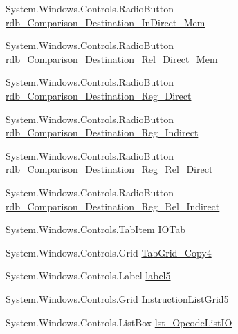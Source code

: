 \begin{DoxyCompactItemize}
\item 
System.\+Windows.\+Controls.\+Radio\+Button \hyperlink{class_c_p_u___o_s___simulator_1_1_instructions_window_afbf88d254cc285a8412281f2f58561df}{rdb\+\_\+\+Comparison\+\_\+\+Destination\+\_\+\+In\+Direct\+\_\+\+Mem}
\item 
System.\+Windows.\+Controls.\+Radio\+Button \hyperlink{class_c_p_u___o_s___simulator_1_1_instructions_window_a2839938b38b1adc8d6274ccd688bce81}{rdb\+\_\+\+Comparison\+\_\+\+Destination\+\_\+\+Rel\+\_\+\+Direct\+\_\+\+Mem}
\item 
System.\+Windows.\+Controls.\+Radio\+Button \hyperlink{class_c_p_u___o_s___simulator_1_1_instructions_window_ad0171922de56e654ef3f2a32522c696f}{rdb\+\_\+\+Comparison\+\_\+\+Destination\+\_\+\+Reg\+\_\+\+Direct}
\item 
System.\+Windows.\+Controls.\+Radio\+Button \hyperlink{class_c_p_u___o_s___simulator_1_1_instructions_window_a7082d6a482df06092eb9fba0db2c6c7e}{rdb\+\_\+\+Comparison\+\_\+\+Destination\+\_\+\+Reg\+\_\+\+Indirect}
\item 
System.\+Windows.\+Controls.\+Radio\+Button \hyperlink{class_c_p_u___o_s___simulator_1_1_instructions_window_a2b612e12101797715ea8bdf811957ee7}{rdb\+\_\+\+Comparison\+\_\+\+Destination\+\_\+\+Reg\+\_\+\+Rel\+\_\+\+Direct}
\item 
System.\+Windows.\+Controls.\+Radio\+Button \hyperlink{class_c_p_u___o_s___simulator_1_1_instructions_window_aa4e8437abdc13829f81759f6a796b6de}{rdb\+\_\+\+Comparison\+\_\+\+Destination\+\_\+\+Reg\+\_\+\+Rel\+\_\+\+Indirect}
\item 
System.\+Windows.\+Controls.\+Tab\+Item \hyperlink{class_c_p_u___o_s___simulator_1_1_instructions_window_aaf736178464d8313c866ab6efeae19c5}{I\+O\+Tab}
\item 
System.\+Windows.\+Controls.\+Grid \hyperlink{class_c_p_u___o_s___simulator_1_1_instructions_window_a33c64471b02aed8597462149051c2b51}{Tab\+Grid\+\_\+\+Copy4}
\item 
System.\+Windows.\+Controls.\+Label \hyperlink{class_c_p_u___o_s___simulator_1_1_instructions_window_acfbda3e1b251a166abc72a07d4cb5025}{label5}
\item 
System.\+Windows.\+Controls.\+Grid \hyperlink{class_c_p_u___o_s___simulator_1_1_instructions_window_a335e8ec02a78ffc483900745de96b602}{Instruction\+List\+Grid5}
\item 
System.\+Windows.\+Controls.\+List\+Box \hyperlink{class_c_p_u___o_s___simulator_1_1_instructions_window_aa8ccd453237503f0e15aff22975cea68}{lst\+\_\+\+Opcode\+List\+I\+O}

\end{DoxyCompactItemize}
